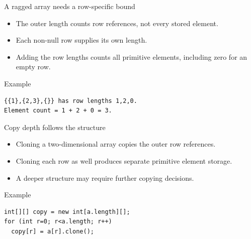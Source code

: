 \documentclass[10pt,aspectratio=169]{beamer}
\begin{document}
\begin{frame}[fragile,t]{A ragged array needs a row-specific bound}
\begin{itemize}
\item The outer length counts row references, not every stored element.
\item Each non-null row supplies its own length.
\item Adding the row lengths counts all primitive elements, including zero for an empty row.
\end{itemize}
\vspace{1mm}\begin{block}{Example}
\begin{lstlisting}
{{1},{2,3},{}} has row lengths 1,2,0.
Element count = 1 + 2 + 0 = 3.
\end{lstlisting}
\end{block}
\end{frame}

\begin{frame}[fragile,t]{Copy depth follows the structure}
\begin{itemize}
\item Cloning a two-dimensional array copies the outer row references.
\item Cloning each row as well produces separate primitive element storage.
\item A deeper structure may require further copying decisions.
\end{itemize}
\vspace{1mm}\begin{block}{Example}
\begin{lstlisting}
int[][] copy = new int[a.length][];
for (int r=0; r<a.length; r++)
  copy[r] = a[r].clone();
\end{lstlisting}
\end{block}
\end{frame}
\end{document}
